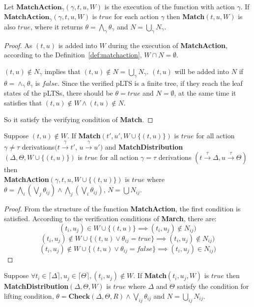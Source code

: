 \documentclass[runningheads]{llncs}
\begin{document}
\begin{proposition}Let $\textbf{MatchAction}_\gamma(\gamma,t,u,W)$ is the execution of the function with action $\gamma$.
If $\textbf{MatchAction}_\gamma(\gamma,t,u,W)$ is $true$ for each action $\gamma$ then \textbf{Match}$(t,u,W)$ is also $true$, where it returns $\theta=\bigwedge_\gamma\theta_\gamma$ and $N=\bigcup_\gamma N_\gamma$.
\end{proposition}
\begin{proof}
As $(t,u)$ is added into $W$ during the execution of \textbf{MatchAction}, according to the Definition~\ref{def:matchaction}, $W\cap N=\emptyset$. 

$(t,u)\notin N_{\gamma}$ implies that $(t,u)\notin N=\bigcup_{\gamma} N_{\gamma}$. $(t,u)$ will be added into $N$ if $\theta=\wedge_{\gamma}\theta_{\gamma}$ is $false$. Since the verified pLTS is a finite tree, if they reach the leaf states of the pLTSs, there should be $\theta=true$ and $N=\emptyset$, at the same time it satisfies that $(t,u)\notin W\wedge(t,u)\notin N$. 

So it satisfy the verifying condition of \textbf{Match}.
\end{proof}
\begin{proposition} Suppose $(t,u)\notin W$.
If \textbf{Match}$(t',u',W\cup\{(t,u)\})$ is $true$ for all action $\gamma\neq\tau$ derivations$(t\xrightarrow{\gamma}t'$, $u\xrightarrow{\gamma}u')$ and \textbf{MatchDistribution}$(\Delta,\Theta,W\cup\{(t,u)\})$ is $true$ for all action $\gamma=\tau$ derivations $(t\xrightarrow{\tau}\Delta,u\xrightarrow{\tau}\Theta)$ then\\
\textbf{MatchAction}$(\gamma,t,u,W\cup\{(t,u)\})$ is $true$ where
$\theta=\bigwedge_i(\bigvee_j\theta_{ij})\wedge\bigwedge_j(\bigvee_i\theta_{ij})$, $N=\bigcup N_{ij}$.
\end{proposition}
\begin{proof}
From the structure of the function \textbf{MatchAction}, the first condition is satisfied.
According to the verification conditions of \textbf{March}, there are:
\[(t_i,u_j)\in W\cup\{(t,u)\}\implies(t_i,u_j)\notin N_{ij})\]
\[(t_i,u_j)\notin W\cup\{(t,u)\vee\theta_{ij}=true\}\implies(t_i,u_j)\notin N_{ij})\]
\[(t_i,u_j)\notin W\cup\{(t,u)\vee\theta_{ij}=false\}\implies(t_i,u_j)\in N_{ij})\]
\end{proof}
\begin{proposition}
Suppose $\forall t_i\in\lceil\Delta\rceil,u_j\in\lceil\Theta\rceil , (t_i,u_j)\notin W$.
If \textbf{Match}$(t_i,u_j,W)$ is $true$ then \textbf{MatchDistribution}$(\Delta,\Theta,W)$ is $true$ where $\Delta$ and $\Theta$ satisfy the condition for lifting condition, $\theta=\textbf{Check}(\Delta,\Theta,\textit{R})\wedge\bigvee_{ij}\theta_{ij}$  and $N=\bigcup_{ij}N_{ij}$.
\end{proposition}
\end{document}

